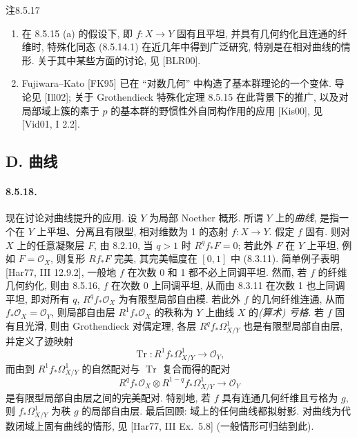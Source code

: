 \begin{origstatement}{注}{8.5.17}\label{ch08:rem8517}
\begin{enumerate}
\item[(a)] 在 8.5.15 (a) 的假设下, 即 $f:X\to Y$ 固有且平坦, 并具有几何约化且连通的纤维时, 特殊化同态 (8.5.14.1) 在近几年中得到广泛研究, 特别是在相对曲线的情形. 关于其中某些方面的讨论, 见 [BLR00].
\item[(b)] Fujiwara--Kato [FK95] 已在 ``对数几何'' 中构造了基本群理论的一个变体. 导论见 [Ill02]; 关于 Grothendieck 特殊化定理 8.5.15 在此背景下的推广, 以及对局部域上簇的素于 $p$ 的基本群的野惯性外自同构作用的应用 [Kis00], 见 [Vid01, I 2.2].
\end{enumerate}
\end{origstatement}

\subsection*{D. 曲线}
\paragraph{8.5.18.}
现在讨论对曲线提升的应用. 设 $Y$ 为局部 Noether 概形. 所谓 $Y$ 上的\emph{曲线}, 是指一个在 $Y$ 上平坦、分离且有限型, 相对维数为 1 的态射 $f:X\to Y$. 假定 $f$ 固有. 则对 $X$ 上的任意凝聚层 $F$, 由 8.2.10, 当 $q>1$ 时 $R^qf_*F=0$; 若此外 $F$ 在 $Y$ 上平坦, 例如 $F=\mathcal O_X$, 则复形 $Rf_*F$ 完美, 其完美幅度在 $[0,1]$ 中 (8.3.11). 简单例子表明 [Har77, III 12.9.2], 一般地 $f$ 在次数 0 和 1 都不必上同调平坦. 然而, 若 $f$ 的纤维几何约化, 则由 8.5.16, $f$ 在次数 0 上同调平坦, 从而由 8.3.11 在次数 1 也上同调平坦, 即对所有 $q$, $R^qf_*\mathcal O_X$ 为有限型局部自由模. 若此外 $f$ 的几何纤维连通, 从而 $f_*\mathcal O_X=\mathcal O_Y$, 则局部自由层 $R^1f_*\mathcal O_X$ 的秩称为 $Y$ 上曲线 $X$ 的\emph{(算术) 亏格}. 若 $f$ 固有且光滑, 则由 Grothendieck 对偶定理, 各层 $R^qf_*\Omega^1_{X/Y}$ 也是有限型局部自由层, 并定义了迹映射
\[\operatorname{Tr}:R^1f_*\Omega^1_{X/Y}\longrightarrow\mathcal O_Y,\]
而由到 $R^1f_*\Omega^1_{X/Y}$ 的自然配对与 $\operatorname{Tr}$ 复合而得的配对
\[R^qf_*\mathcal O_X\otimes R^{1-q}f_*\Omega^1_{X/Y}\longrightarrow\mathcal O_Y\]
是有限型局部自由层之间的完美配对. 特别地, 若 $f$ 具有连通几何纤维且亏格为 $g$, 则 $f_*\Omega^1_{X/Y}$ 为秩 $g$ 的局部自由层. 最后回顾: 域上的任何曲线都拟射影. 对曲线为代数闭域上固有曲线的情形, 见 [Har77, III Ex.~5.8] (一般情形可归结到此).


